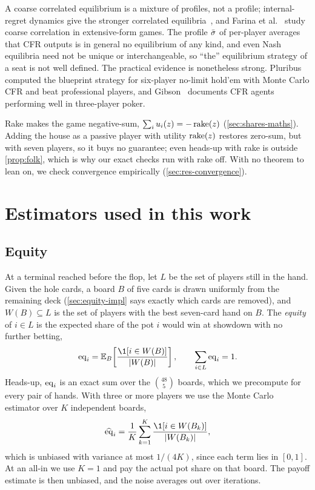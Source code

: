 A coarse correlated equilibrium is a mixture of profiles, not a profile; internal-regret dynamics give the
stronger correlated equilibria~\cite{hart2000}, and Farina et al.~\cite{farina2020coarse} study coarse correlation in
extensive-form games. The profile $\bar\sigma$ of per-player averages that CFR outputs is in general no equilibrium of
any kind, and even Nash equilibria need not be unique or interchangeable, so ``the'' equilibrium strategy of a seat is
not well defined. The practical evidence is nonetheless strong. Pluribus~\cite{brown2019pluribus} computed the blueprint strategy for six-player no-limit hold'em
with Monte Carlo CFR and beat professional players, and Gibson~\cite{gibson2014} documents CFR agents performing well
in three-player poker.

Rake makes the game negative-sum, $\sum_i u_i(z) = -\operatorname{rake}(z)$ (\cref{sec:shares-maths}). Adding the house as a
passive player with utility $\operatorname{rake}(z)$ restores zero-sum, but with seven players, so it buys no guarantee; even
heads-up with rake is outside \cref{prop:folk}, which is why our exact checks run with rake off. With no theorem to
lean on, we check convergence empirically (\cref{sec:res-convergence}).

\section{Estimators used in this work}\label{sec:estimators}

\subsection{Equity}\label{sec:equity-maths}

At a terminal reached before the flop, let $L$ be the set of players still in the hand. Given the hole cards, a board
$B$ of five cards is drawn uniformly from the remaining deck (\cref{sec:equity-impl} says exactly which cards are
removed), and $W(B) \subseteq L$ is the set of players with the best seven-card hand on $B$. The \emph{equity} of $i
\in L$ is the expected share of the pot $i$ would win at showdown with no further betting,
\[
  \eq_i = \E_B\!\left[\frac{\1[i \in W(B)]}{|W(B)|}\right], \qquad \sum_{i\in L} \eq_i = 1.
\]
Heads-up, $\mathrm{eq}_i$ is an exact sum over the $\binom{48}{5}$ boards, which we precompute for every pair of hands. With
three or more players we use the Monte Carlo estimator over $K$ independent boards,
\[
  \widehat\eq_i = \frac1K \sum_{k=1}^K \frac{\1[i \in W(B_k)]}{|W(B_k)|},
\]
which is unbiased with variance at most $1/(4K)$, since each term lies in $[0,1]$. At an all-in we use $K = 1$ and pay
the actual pot share on that board. The payoff estimate is then unbiased, and the noise averages out over iterations.

